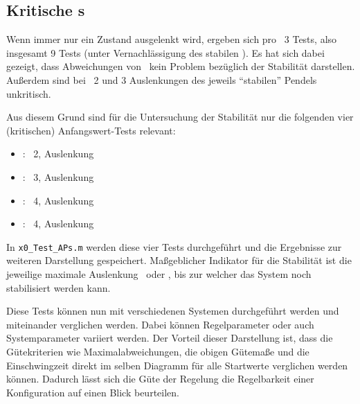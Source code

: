 \subsection{Kritische \xots s}\label{subsec:xotskrit}

Wenn immer nur ein Zustand ausgelenkt wird, ergeben sich pro \ap\ 3 Tests, also insgesamt 9 Tests (unter Vernachlässigung des stabilen \ape).
Es hat sich dabei gezeigt, dass Abweichungen von \xo\ kein Problem bezüglich der Stabilität darstellen.
Außerdem sind bei \ap\ 2 und 3 Auslenkungen des jeweils "`stabilen"' Pendels unkritisch.

Aus diesem Grund sind für die Untersuchung der Stabilität nur die folgenden vier (kritischen) Anfangswert-Tests relevant:
\begin{itemize}
	\item \texttt{\apz}: \ap\ 2, Auslenkung \phz
	\item \texttt{\apd}: \ap\ 3, Auslenkung \phe
	\item \texttt{}: \ap\ 4, Auslenkung \phe
	\item \texttt{}: \ap\ 4, Auslenkung \phz
\end{itemize}
In \texttt{x0\_Test\_APs.m} werden diese vier Tests durchgeführt und die Ergebnisse zur weiteren Darstellung gespeichert.
Maßgeblicher Indikator für die Stabilität ist die jeweilige maximale Auslenkung \phe\ oder \phz, bis zur welcher das System noch stabilisiert werden kann.

Diese Tests können nun mit verschiedenen Systemen durchgeführt werden und miteinander verglichen werden.
Dabei können Regelparameter oder auch Systemparameter variiert werden.
Der Vorteil dieser Darstellung ist, dass die Gütekriterien wie Maximalabweichungen, die obigen Gütemaße und die Einschwingzeit direkt im selben Diagramm für alle Startwerte verglichen werden können.
Dadurch lässt sich die Güte der Regelung \bzw die Regelbarkeit einer Konfiguration auf einen Blick beurteilen.



